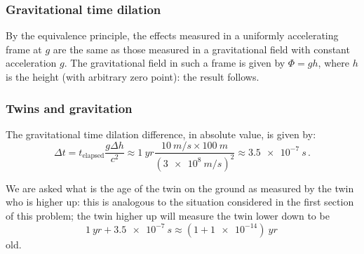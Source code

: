 \documentclass[main.tex]{subfiles}
\begin{document}
\subsubsection{Gravitational time dilation}

By the equivalence principle, the effects measured in a uniformly accelerating frame at \(g\) are the same as those measured in a gravitational field with constant acceleration \(g\).
The gravitational field in such a frame is given by \(\Phi  = gh\), where \(h\) is the height (with arbitrary zero point): the result follows.

\subsubsection{Twins and gravitation}

The gravitational time dilation difference, in absolute value, is given by: 
%
\begin{equation}
  \Delta t = t _{\text{elapsed}} \frac{g \Delta h}{c^2}
  \approx \SI{1}{yr} \frac{\SI{10}{m/s} \times \SI{100}{m}}{(\SI{3e8}{m/s})^2} \approx \SI{3.5e-7}{s} 
\,.
\end{equation}

We are asked what is the age of the twin on the ground as measured by the twin who is higher up: this is analogous to the situation considered in the first section of this problem; the twin higher up will measure the twin lower down to be 
%
\begin{equation}
  \SI{1}{yr} + \SI{3.5e-7}{s} \approx (1+\num{1e-14}) \SI{}{yr} 
\,
\end{equation}
%
old.
\end{document}
